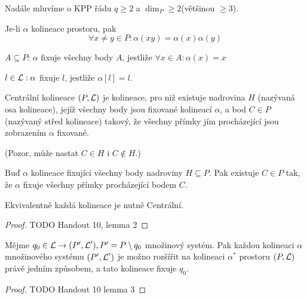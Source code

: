 \begin{agreement}
	Nadále mluvíme o KPP řádu $q \geq 2$ a $\dim_P \geq 2$(většinou $\geq 3$).
\end{agreement}

\begin{note}
    Je-li $\alpha$ kolineace prostoru, pak
    \[ \forall x\neq y\in P: \alpha(xy)=\alpha(x)\alpha(y) \]
\end{note}

\begin{definition}[Fixace]
    $A\subseteq P$: $\alpha$ fixuje všechny body $A$, jestliže $\forall x\in A: \alpha(x)=x$

    $l\in\operatorname{\mathcal{L}}: \alpha$ fixuje $l$, jestliže $\alpha[l]=l$.
\end{definition}

\begin{definition}\label{kpp:centr_kolin}
    Centrální kolineace $(P,\operatorname{\mathcal{L}})$ je kolineace, pro niž existuje nadrovina $H$ (nazývaná osa kolineace), jejíž všechny body jsou fixované kolineací $\alpha$, a bod $C\in P$ (nazývaný střed kolineace) takový, že všechny přímky jím procházející jsou zobrazením $\alpha$ fixované.

    (Pozor, může nastat $C\in H$ i $C\not\in H$.)
\end{definition}

\begin{lemma}
    Buď $\alpha$ kolineace fixující všechny body nadroviny $H\subseteq P$.
    Pak existuje $C\in P$ tak, že $\alpha$ fixuje  všechny přímky procházející bodem $C$.

    Ekvivalentně každá kolineace je nutně Centrální.
\end{lemma}
\begin{proof}
    TODO Handout 10, lemma 2
\end{proof}

\begin{lemma}
    Mějme $q_0\in\operatorname{\mathcal{L}}\rightarrow (P',\operatorname{\mathcal{L}}'), P' = P\setminus q_0$ množinový systém.
    Pak každou kolineaci $\alpha$ množinového systému $(P',\operatorname{\mathcal{L}}')$ je možno rozšířit na kolineaci $\alpha^*$ prostoru $(P, \operatorname{\mathcal{L}})$ právě jedním způsobem, a tato kolineace fixuje $q_0$.
\end{lemma}
\begin{proof}
    TODO Handout 10 lemma 3
\end{proof}

